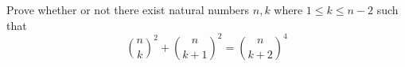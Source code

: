 Prove whether or not there exist natural numbers $n,k$ where $1\le k\le n-2$ such that
\[\binom{n}{k}^2+\binom{n}{k+1}^2=\binom{n}{k+2}^4 \]